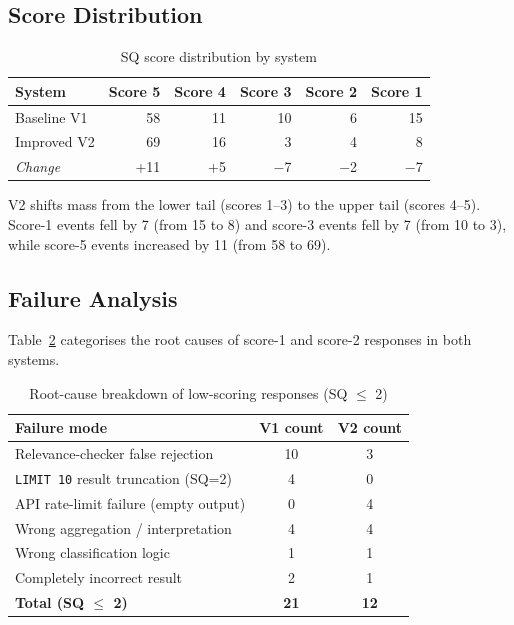 \subsection{Score Distribution}

\begin{table}[h]
\centering
\caption{SQ score distribution by system}
\label{tab:sq_dist}
\begin{tabular}{lrrrrr}
\toprule
\textbf{System} & \textbf{Score 5} & \textbf{Score 4} & \textbf{Score 3}
               & \textbf{Score 2} & \textbf{Score 1} \\
\midrule
Baseline V1 & 58 & 11 & 10 & 6 & 15 \\
Improved V2 & 69 & 16 &  3 & 4 &  8 \\
\midrule
\textit{Change} & +11 & +5 & $-$7 & $-$2 & $-$7 \\
\bottomrule
\end{tabular}
\end{table}

V2 shifts mass from the lower tail (scores 1–3) to the upper tail (scores 4–5).
Score-1 events fell by 7 (from 15 to 8) and score-3 events fell by 7 (from 10 to 3),
while score-5 events increased by 11 (from 58 to 69).

\subsection{Failure Analysis}

Table~\ref{tab:failures} categorises the root causes of score-1 and score-2
responses in both systems.

\begin{table}[h]
\centering
\caption{Root-cause breakdown of low-scoring responses (SQ $\leq$ 2)}
\label{tab:failures}
\begin{tabular}{lcc}
\toprule
\textbf{Failure mode} & \textbf{V1 count} & \textbf{V2 count} \\
\midrule
Relevance-checker false rejection & 10 & 3 \\
\texttt{LIMIT 10} result truncation (SQ=2) & 4 & 0 \\
API rate-limit failure (empty output) & 0 & 4 \\
Wrong aggregation / interpretation & 4 & 4 \\
Wrong classification logic & 1 & 1 \\
Completely incorrect result & 2 & 1 \\
\midrule
\textbf{Total (SQ $\leq$ 2)} & \textbf{21} & \textbf{12} \\
\bottomrule
\end{tabular}
\end{table}

